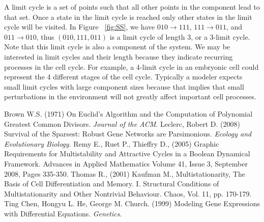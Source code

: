 \documentclass[11pt]{amsart}
\begin{document}
A limit cycle is a set of points such that all other points in the component
lead to that set. Once a state in the limit cycle is reached only other states
in the limit cycle will be visited. In Figure ~\ref{fig:SS}, we have $010
\rightarrow 111$, $111 \rightarrow 011$, and $011 \rightarrow 010$, thus
$(010, 111, 011)$ is a limit cycle of length 3, or a 3-limit cycle. Note that
this limit cycle is also a component of the system.  We may be interested in
limit cycles and their length because they indicate recurring processes in the
cell cycle. For example, a 4-limit cycle in an embryonic cell could represent
the 4 different stages of the cell cycle. Typically a modeler expects small
limit cycles with large component sizes because that implies that small
perturbations in the environment will not greatly affect important cell
processes.


\begin{thebibliography}{5in}
\small
	 Brown W.S. (1971) On Euclid's Algorithm and the Computation of Polynomial Greatest Common Divisors. \textit{Journal of the ACM}.
   Leclerc, Robert D. (2008) Survival of the Sparsest: Robust Gene Networks are Parsimonious. \textit{Ecology and Evolutionary Biology}.
	 Remy E., Ruet P., Thieffry D., (2005) Graphic Requirements for Multistability and Attractive Cycles in a Boolean Dynamical Framework. Advances in Applied Mathematics Volume 41, Issue 3, September 2008, Pages 335-350.
	 Thomas R., (2001) Kaufman M., Multistationarity, The Basis of Cell Differentiation and Memory. I. Structural Conditions of Multistationarity and Other Nontrivial Behaviour. Chaos, Vol. 11, pp. 170-179.
	 Ting Chen, Hongyu L. He, George M. Church. (1999) Modeling Gene Expressions with Differential Equations. \textit{Genetics}.
\end{thebibliography}


%

\end{document}
